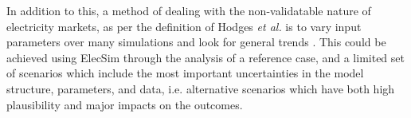 In addition to this, a method of dealing with the non-validatable nature of electricity markets, as per the definition of Hodges \textit{et al.} is to vary input parameters over many simulations and look for general trends \cite{Hodges}. This could be achieved using ElecSim through the analysis of a reference case, and a limited set of scenarios which include the most important uncertainties in the model structure, parameters, and data, i.e. alternative scenarios which have both high plausibility and major impacts on the outcomes.


